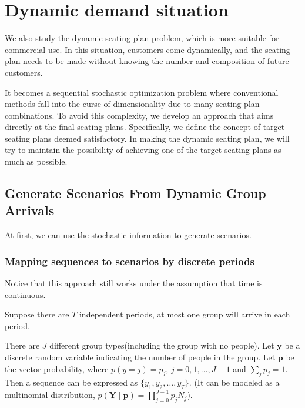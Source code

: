 \section{Dynamic demand situation}\label{dynamic_demand}

We also study the dynamic seating plan problem, which is more suitable for commercial use. In this situation, customers come dynamically, and the seating plan needs to be made without knowing the number and composition of future customers. 

It becomes a sequential stochastic optimization problem where conventional methods fall into the curse of dimensionality due to many seating plan combinations. To avoid this complexity, we develop an approach that aims directly at the final seating plans. Specifically, we define the concept of target seating plans deemed satisfactory. In making the dynamic seating plan, we will try to maintain the possibility of achieving one of the target seating plans as much as possible.

\subsection{Generate Scenarios From Dynamic Group Arrivals}\label{MappingSeq}

At first, we can use the stochastic information to generate scenarios.




\subsubsection{Mapping sequences to scenarios by discrete periods}

Notice that this approach still works under the assumption that time is continuous.

Suppose there are $T$ independent periods, at most one group will arrive in each period.

There are $J$ different group types(including the group with no people). Let $\mathbf{y}$ be a discrete random variable indicating the number of people in the group. Let $\mathbf{p}$ be the vector probability, where $p(y = j) = p_j$, $j = 0,1,\ldots,J-1$ and $\sum_{j} p_{j} =1$. Then a sequence can be expressed as $\{y_{1}, y_{2}, \ldots, y_{T}\}$. (It can be modeled as a multinomial distribution, $p(\mathbf{Y} \mid \mathbf{p})=\prod_{j=0}^{J-1} p_j N_j$).

